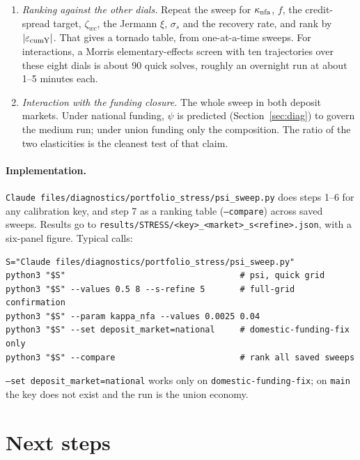 \documentclass[11pt]{article}
\newcommand{\code}[1]{\texttt{\small #1}}
\begin{document}
\begin{enumerate}
(Bocola's $\sum F^2\le m\cdot10^{-18}$), the largest box clip along the IRF (the bond-state
band is $\pm12\%$, so a small $\psi$ can push holdings out of the box), and the impact read two
ways, fitted and exactly cleared. A $\psi$ effect smaller than that gap is not identified at
the current resolution. On the full grid, add the Euler-error report on the ergodic set.
\item \emph{Ranking against the other dials.} Repeat the sweep for $\kappa_{\rm nfa}$, $f$, the
credit-spread target, $\zeta_{wc}$, the Jermann $\xi$, $\sigma_s$ and the recovery rate, and rank
by $|\varepsilon_{\rm cumY}|$. That gives a tornado table, from one-at-a-time sweeps. For
interactions, a Morris elementary-effects screen \citep{morris1991factorial} with ten
trajectories over these eight dials is about 90 quick solves, roughly an overnight run at
about 1--5 minutes each.
\item \emph{Interaction with the funding closure.} The whole sweep in both deposit markets.
Under national funding, $\psi$ is predicted (Section~\ref{sec:diag}) to govern the medium run;
under union funding only the composition. The ratio of the two elasticities is the cleanest
test of that claim.
\end{enumerate}

\paragraph{Implementation.} \code{Claude files/diagnostics/portfolio\_stress/psi\_sweep.py} does
steps 1--6 for any calibration key, and step 7 as a ranking table (\code{--compare}) across saved
sweeps. Results go to \code{results/STRESS/<key>\_<market>\_s<refine>.json}, with a six-panel
figure. Typical calls:
\begin{verbatim}
S="Claude files/diagnostics/portfolio_stress/psi_sweep.py"
python3 "$S"                                   # psi, quick grid
python3 "$S" --values 0.5 8 --s-refine 5       # full-grid confirmation
python3 "$S" --param kappa_nfa --values 0.0025 0.04
python3 "$S" --set deposit_market=national     # domestic-funding-fix only
python3 "$S" --compare                         # rank all saved sweeps
\end{verbatim}
\code{--set deposit\_market=national} works only on \code{domestic-funding-fix}; on \code{main}
the key does not exist and the run is the union economy.



\section{Next steps}
\end{document}

